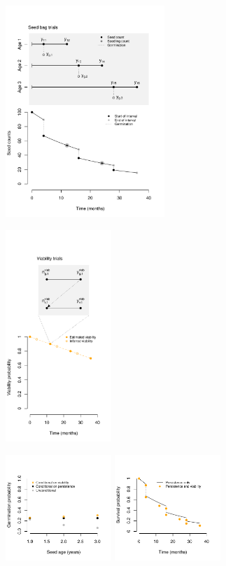 \documentclass[varwidth=\maxdimen,border=0pt]{standalone}
\begin{document}
    

\begin{figure}

    \begin{subfigure}{6cm}
        \centering
        \includegraphics[width=6cm]{../../miscellaneous/conceptual/persistence.pdf} 
    \end{subfigure}%
    \begin{subfigure}{4cm}
        \centering
        \includegraphics[width=4cm]{../../miscellaneous/conceptual/viability.pdf} 
    \end{subfigure}
    \begin{subfigure}{4cm}
        \centering
        \includegraphics[width=4cm]{../../miscellaneous/conceptual/germination.pdf} 
        \includegraphics[width=4cm]{../../miscellaneous/conceptual/survival.pdf} 
    \end{subfigure}
    
\end{figure}
  
  
\end{document}
